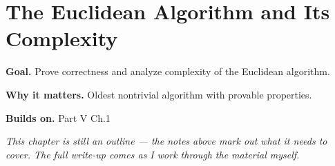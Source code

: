 \chapter{The Euclidean Algorithm and Its Complexity}
\label{ch:05-number-theory-03}

\begin{chapterintro}
\textbf{Goal.} Prove correctness and analyze complexity of the Euclidean algorithm.

\textbf{Why it matters.} Oldest nontrivial algorithm with provable properties.

\textbf{Builds on.} Part V Ch.1
\end{chapterintro}

\textit{This chapter is still an outline --- the notes above mark out what it needs to cover. The full write-up comes as I work through the material myself.}
